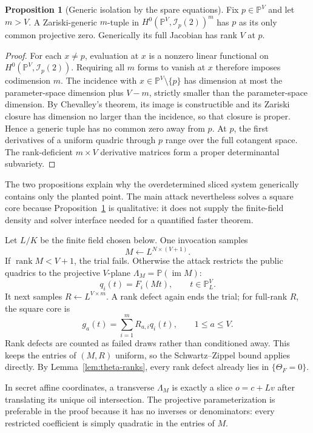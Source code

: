 \documentclass[11pt,a4paper]{article}
\theoremstyle{definition}
\newtheorem{proposition}[theorem]{Proposition}
\theoremstyle{remark}
\newcommand{\PP}{\mathbb P}
\newcommand{\rank}{\operatorname{rank}}
\begin{document}
\begin{proposition}[Generic isolation by the spare equations]\label{prop:generic-full-isolation}
Fix $p\in\PP^V$ and let $m>V$.  A Zariski-generic $m$-tuple in $H^0(\PP^V,\mathcal I_p(2))^m$ has $p$ as its only common projective zero.  Generically its full Jacobian has rank $V$ at $p$.
\end{proposition}

\begin{proof}
For each $x\ne p$, evaluation at $x$ is a nonzero linear functional on $H^0(\PP^V,\mathcal I_p(2))$.  Requiring all $m$ forms to vanish at $x$ therefore imposes codimension $m$.  The incidence with $x\in\PP^V\setminus\{p\}$ has dimension at most the parameter-space dimension plus $V-m$, strictly smaller than the parameter-space dimension.  By Chevalley's theorem, its image is constructible and its Zariski closure has dimension no larger than the incidence, so that closure is proper.  Hence a generic tuple has no common zero away from $p$.  At $p$, the first derivatives of a uniform quadric through $p$ range over the full cotangent space.  The rank-deficient $m\times V$ derivative matrices form a proper determinantal subvariety.
\end{proof}

The two propositions explain why the overdetermined sliced system generically contains only the planted point.  The main attack nevertheless solves a square core because Proposition~\ref{prop:generic-full-isolation} is qualitative: it does not supply the finite-field density and solver interface needed for a quantified faster theorem.

Let $L/K$ be the finite field chosen below.  One invocation samples
\[
M\leftarrow L^{N\times(V+1)}.
\]
If $\rank M<V+1$, the trial fails.  Otherwise the attack restricts the public quadrics to the projective $V$-plane $\Lambda_M=\PP(\operatorname{im}M)$:
\[
q_i(t)=F_i(Mt),\qquad t\in\PP^V_L.
\]
It next samples $R\leftarrow L^{V\times m}$.  A rank defect again ends the trial; for full-rank $R$, the square core is
\[
g_a(t)=\sum_{i=1}^m R_{a,i}q_i(t),\qquad 1\le a\le V.
\]
Rank defects are counted as failed draws rather than conditioned away.  This keeps the entries of $(M,R)$ uniform, so the Schwartz--Zippel bound applies directly.  By Lemma~\ref{lem:theta-ranks}, every rank defect already lies in $\{\Theta_F=0\}$.

In secret affine coordinates, a transverse $\Lambda_M$ is exactly a slice $o=c+Lv$ after translating its unique oil intersection.  The projective parameterization is preferable in the proof because it has no inverses or denominators: every restricted coefficient is simply quadratic in the entries of $M$.
\end{document}
